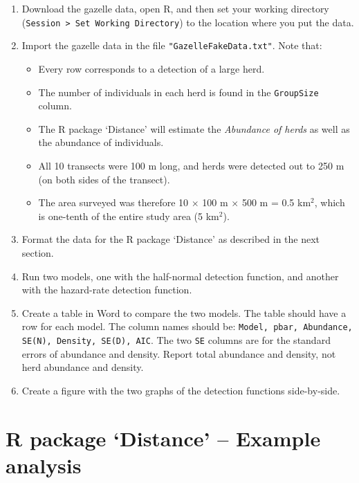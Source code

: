 \documentclass[12pt]{article}\usepackage[]{graphicx}\usepackage[]{xcolor}
\newcommand{\inr}[1]{\colorbox{inlinecolor}{\texttt{#1}}}
\begin{document}
\begin{enumerate}
  \item Download the gazelle data, open R, and then set your working
    directory (\texttt{Session > Set Working Directory}) to the
    location where you put the data.
  \item Import the gazelle data in the file
    \verb+"GazelleFakeData.txt"+. Note that:
    \begin{itemize}
      \item Every row corresponds to a detection of a large herd.
      \item The number of individuals in each herd is found in
        the \inr{GroupSize} column. 
      \item The R package `Distance' will estimate the
        \textit{Abundance of herds} as well as the abundance of
        individuals.
      \item All 10 transects were 100 m long, and herds were detected
        out to 250 m (on both sides of the transect).
      \item The area surveyed was therefore
        10 $\times$ 100 m $\times$ 500 m = 0.5 km$^2$,
        which is one-tenth of the entire study area (5 km$^2$).
    \end{itemize}
  \item Format the data for the R package `Distance' as described in
    the next section.  
  \item Run two models, one with the half-normal detection function,
    and another with the hazard-rate detection function.
  \item Create a table in Word to compare the two models. The table
    should have a row for each model. The column names should be:
    \texttt{Model, pbar, Abundance, SE(N), Density, SE(D), AIC}.
    The two \verb+SE+ columns are for the standard errors of
    abundance and density. Report total abundance and density, not
    herd abundance and density.
  \item Create a figure with the two graphs of the detection functions
    side-by-side.
\end{enumerate}



\clearpage




\section*{R package `Distance' -- Example analysis}
\end{document}
